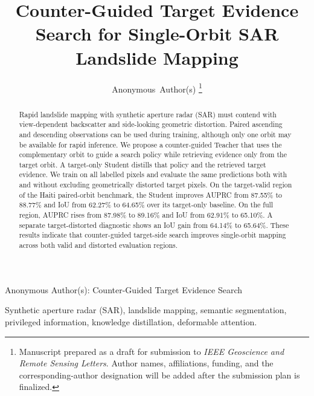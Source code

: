 \documentclass[journal]{IEEEtran}
\begin{document}
\title{Counter-Guided Target Evidence Search for Single-Orbit SAR Landslide Mapping}

\author{Anonymous~Author(s)%
\thanks{Manuscript prepared as a draft for submission to \emph{IEEE Geoscience and Remote Sensing Letters}. Author names, affiliations, funding, and the corresponding-author designation will be added after the submission plan is finalized.}}

%
{Anonymous Author(s): Counter-Guided Target Evidence Search}

\maketitle

\begin{abstract}
Rapid landslide mapping with synthetic aperture radar (SAR) must contend with view-dependent backscatter and side-looking geometric distortion. Paired ascending and descending observations can be used during training, although only one orbit may be available for rapid inference. We propose a counter-guided Teacher that uses the complementary orbit to guide a search policy while retrieving evidence only from the target orbit. A target-only Student distills that policy and the retrieved target evidence. We train on all labelled pixels and evaluate the same predictions both with and without excluding geometrically distorted target pixels. On the target-valid region of the Haiti paired-orbit benchmark, the Student improves AUPRC from 87.55\% to 88.77\% and IoU from 62.27\% to 64.65\% over its target-only baseline. On the full region, AUPRC rises from 87.98\% to 89.16\% and IoU from 62.91\% to 65.10\%. A separate target-distorted diagnostic shows an IoU gain from 64.14\% to 65.64\%. These results indicate that counter-guided target-side search improves single-orbit mapping across both valid and distorted evaluation regions.
\end{abstract}

\begin{IEEEkeywords}
Synthetic aperture radar (SAR), landslide mapping, semantic segmentation, privileged information, knowledge distillation, deformable attention.
\end{IEEEkeywords}






{\scriptsize


}
\end{document}
